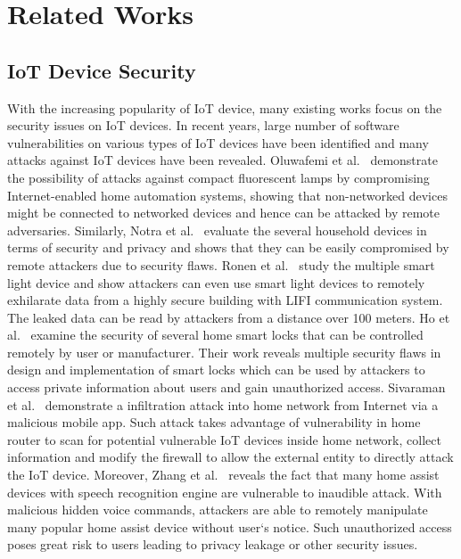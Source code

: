 \section{Related Works}\label{sec:related}

\subsection{IoT Device Security}
With the increasing popularity of IoT device, many existing works focus on the security issues on IoT devices. In recent years, large number of software vulnerabilities on various types of IoT devices have been identified and many attacks against IoT devices have been revealed. Oluwafemi et al.~\cite{oluwafemi2013experimental} demonstrate the possibility of attacks against compact fluorescent lamps by compromising Internet-enabled home automation systems, showing that non-networked devices might be connected to networked devices and hence can be attacked by remote adversaries. Similarly, Notra et al.~\cite{notra2014experimental} evaluate the several household devices in terms of security and privacy and shows that they can be easily compromised by remote attackers due to security flaws. Ronen et al.~\cite{ronen2016extended} study the multiple smart light device and show attackers can even use smart light devices to remotely exhilarate data from a highly secure building with LIFI communication system. The leaked data can be read by attackers from a distance over 100 meters. Ho et al.~\cite{ho2016smart} examine the security of several home smart locks that can be controlled remotely by user or manufacturer. Their work reveals multiple security flaws in design and implementation of smart locks which can be used by attackers to access private information about users and gain unauthorized access. Sivaraman et al.~\cite{sivaraman2016smart} demonstrate a infiltration attack into home network from Internet via a malicious mobile app. Such attack takes advantage of vulnerability in home router to scan for potential vulnerable IoT devices inside home network, collect information and modify the firewall to allow the external entity to directly attack the IoT device. Moreover, Zhang et al.~\cite{zhang2017dolphinattack} reveals the fact that many home assist devices with speech recognition engine are vulnerable to inaudible attack. With malicious hidden voice commands, attackers are able to remotely manipulate many popular home assist device without user‘s notice. Such unauthorized access poses great risk to users leading to privacy leakage or other security issues. 

